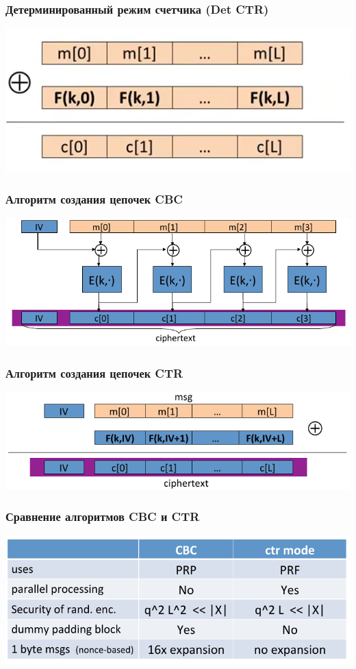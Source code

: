 \documentclass{beamer}
\begin{document}
\begin{frame}
  \frametitle{Детерминированный режим счетчика (Det CTR)}

  \includegraphics[width=\linewidth]{images/png/deterministic_CTR}

\end{frame}


\begin{frame}
  \frametitle{Алгоритм создания цепочек CBC}

  \includegraphics[width=\linewidth]{images/png/CBC_random_IV}

\end{frame}


\begin{frame}
  \frametitle{Алгоритм создания цепочек CTR}

  \includegraphics[width=\linewidth]{images/png/CTR_mode}

\end{frame}


\begin{frame}
  \frametitle{Сравнение алгоритмов CBC и CTR}

  \includegraphics[width=\linewidth]{images/png/CTR_vs_CBC_comparison}

\end{frame}
\end{document}
